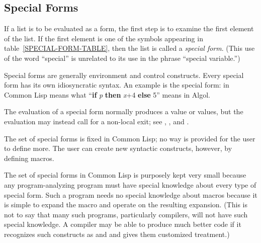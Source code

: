 \subsection{Special Forms}

If a list is to be evaluated as a form, the first step is to examine
the first element of the list.  If the first element is one of
the symbols appearing in table~\ref{SPECIAL-FORM-TABLE},
then the list is called a \emph{special form}.  (This use of the word
``special'' is unrelated to its use in the phrase ``special variable.'')

Special forms are generally environment and control constructs.
Every special form has its own idiosyncratic syntax.  An example
is the  special form:
 in Common Lisp means what
``\textbf{if} \emph{p} \textbf{then} \emph{x}+4 \textbf{else} 5'' means in
Algol.

The evaluation of a special form normally produces a value or values,
but the evaluation may instead call for a non-local exit; see ,
, and .

The set of special forms is fixed in Common Lisp; no way is provided
for the user to define more.  The user can create new syntactic
constructs, however, by defining macros.

The set of special forms in Common Lisp is purposely kept very small
because any program-analyzing program must have special knowledge
about every type of special form.  Such a program needs no special
knowledge about macros because it is simple to expand the macro
and operate on the resulting expansion.  (This is not to say that
many such programs, particularly compilers, will not have such
special knowledge.  A compiler may be able
to produce much better code if it recognizes such constructs
as  and  and gives them customized
treatment.)

